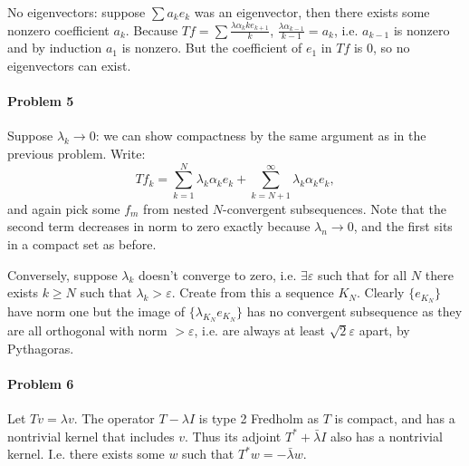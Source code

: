 \documentclass[12pt]{article}
\begin{document}
No eigenvectors: suppose $\sum a_ke_k$ was an eigenvector, then there exists
some nonzero coefficient $a_k$. Because $Tf = \sum \frac{\lambda \alpha_{k}{k}
  e_{k+1}}{k}$, $\frac{\lambda\alpha_{k-1}}{k-1} = a_k$, i.e. $a_{k-1}$ is
nonzero and by induction $a_1$ is nonzero. But the coefficient of $e_1$ in $Tf$
is 0, so no eigenvectors can exist.

\paragraph{Problem 5}

Suppose $\lambda_k \to 0$: we can show compactness by the same argument as in
the previous problem. Write:
\begin{displaymath}
  Tf_k = \sum_{k=1}^N\lambda_k\alpha_ke_k + \sum_{k=N+1}^\infty\lambda_k\alpha_ke_k,
\end{displaymath}
and again pick some $f_m$ from nested $N$-convergent subsequences. Note that
the second term decreases in norm to zero exactly because $\lambda_n\to 0$, and
the first sits in a compact set as before.

Conversely, suppose $\lambda_k$ doesn't converge to zero, i.e. $\exists
\varepsilon$ such that for all $N$ there exists $k \geq N$ such that $\lambda_k
> \varepsilon$. Create from this a sequence $K_N$. Clearly $\{e_{K_N}\}$ have
norm one but the image of $\{\lambda_{K_N}e_{K_N}\}$ has no convergent
subsequence
as they are all orthogonal with norm $> \varepsilon$, i.e. are always at least
$\sqrt{2}\varepsilon$ apart, by Pythagoras.

\paragraph{Problem 6}

Let $Tv = \lambda v$. The operator $T-\lambda I$ is type 2 Fredholm as $T$ is
compact, and has a nontrivial kernel that includes $v$. Thus its adjoint
$T^* + \bar{\lambda}I$ also has a nontrivial kernel. I.e. there exists some
$w$ such that $T^*w = -\bar{\lambda}w$.
\end{document}
